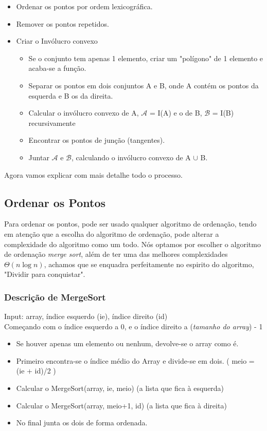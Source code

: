 \documentclass[11pt]{article}
\begin{document}
\begin{itemize}
    \item Ordenar os pontos por ordem lexicográfica.
    \item Remover os pontos repetidos.
    \item Criar o Invólucro convexo
    \begin{itemize}
        \item Se o conjunto tem apenas 1 elemento, criar um "polígono"
            de 1 elemento e acaba-se a função.
        \item Separar os pontos em dois conjuntos A e B, 
            onde A contém os pontos da esquerda e B os da direita.
        \item Calcular o invólucro convexo de A, 
            $\mathcal{A}$ = I(A) e o de B, $\mathcal{B}$ = I(B) recursivamente
        \item Encontrar os pontos de junção (tangentes).
        \item Juntar $\mathcal{A}$ e $\mathcal{B}$, 
            calculando o invólucro convexo de A $\cup$ B.
    \end{itemize}
\end{itemize}

Agora vamos explicar com mais detalhe todo o processo.
\subsection{ Ordenar os Pontos }
Para ordenar os pontos, pode ser usado qualquer algoritmo de ordenação,
tendo em atenção que a escolha do algoritmo de ordenação, pode alterar a
complexidade do algoritmo como um todo.
Nós optamos por escolher o algoritmo de ordenação \textit{merge sort},
além de ter uma das melhores complexidades $\Theta(n\log{}n)$, achamos 
que se enquadra perfeitamente no espirito do algoritmo, "Dividir para conquistar".

\subsubsection{Descrição de MergeSort}
Input: array, índice esquerdo (ie), índice direito (id)\\

Começando com o índice esquerdo a 0, e o índice direito a (\textit{tamanho do array}) - 1
\begin{itemize}
    \item Se houver apenas um elemento ou nenhum, devolve-se o array como é.
    \item Primeiro encontra-se o índice médio do Array e divide-se em dois. 
        ( meio = (ie + id)/2 )
    \item Calcular o MergeSort(array, ie, meio) (a lista que fica à esquerda)
    \item Calcular o MergeSort(array, meio+1, id) (a lista que fica à direita)
    \item No final junta os dois de forma ordenada.
\end{itemize}
\end{document}
